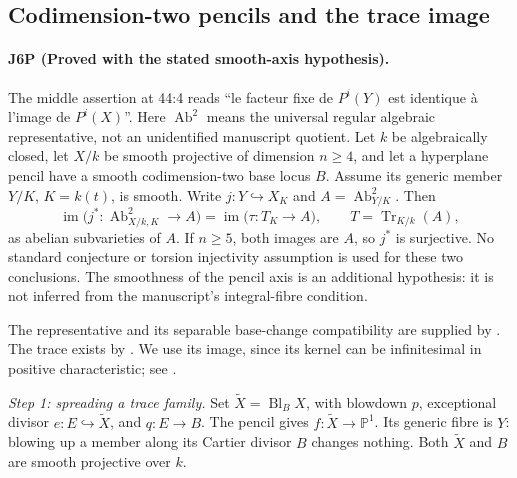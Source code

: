 \subsection{Codimension-two pencils and the trace image}
\paragraph{J6P (Proved with the stated smooth-axis hypothesis).}
The middle assertion at 44:4 reads ``le facteur fixe de $P^i(Y)$
est identique à l'image de $P^i(X)$''. Here $\operatorname{Ab}^2$ means the universal regular algebraic
representative, not an unidentified manuscript quotient.
Let $k$ be algebraically closed, let $X/k$ be smooth projective of
dimension $n\geq4$, and let a hyperplane pencil have a smooth
codimension-two base locus $B$. Assume its generic member $Y/K$,
$K=k(t)$, is smooth. Write $j:Y\hookrightarrow X_K$ and
$A=\operatorname{Ab}^2_{Y/K}$. Then
\begin{equation}\label{eq:J6P-trace}
 \operatorname{im}\bigl(j^*:\operatorname{Ab}^2_{X/k,K}\longrightarrow A\bigr)
 =\operatorname{im}\bigl(\tau:T_K\longrightarrow A\bigr),
 \qquad T=\operatorname{Tr}_{K/k}(A),
\end{equation}
as abelian subvarieties of $A$. If $n\geq5$, both images are $A$,
so $j^*$ is surjective. No standard conjecture or torsion
injectivity assumption is used for these two conclusions.
The smoothness of the pencil axis is an additional hypothesis:
it is not inferred from the manuscript's integral-fibre condition.

The representative and its separable base-change compatibility
are supplied by \cite[Theorems 6.1 and 5.10, pp.~25--27]{DGJ_ACMVFunctor}.
The trace exists by \cite[Definition 6.1 and Theorem 6.2, p.~20]{DGJ_Conrad2006}.
We use its image, since its kernel can be infinitesimal in positive
characteristic; see \cite[Theorem 6.12, pp.~22--23]{DGJ_Conrad2006}.

\emph{Step 1: spreading a trace family.}
Set $\widetilde X=\operatorname{Bl}_B X$, with blowdown $p$,
exceptional divisor $e:E\hookrightarrow\widetilde X$, and
$q:E\to B$. The pencil gives $f:\widetilde X\to\mathbb P^1$.
Its generic fibre is $Y$: blowing up a member along its Cartier
divisor $B$ changes nothing. Both $\widetilde X$ and $B$ are
smooth projective over $k$.

